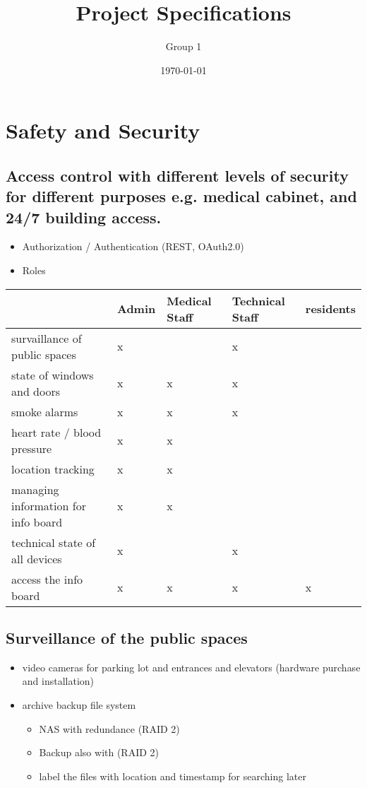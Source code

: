 \documentclass
[
 12pt, %
       DIV12,
       a4paper, %
       oneside, %
       titlepage, %
       parskip=half, %
       headings=normal, %
       listof=totoc, %
       bibliography=totoc, %
       index=totoc, %
       captions=tableheading, %
       ]{scrreprt}
\author{Group 1}
\date{\today}
\title{Project Specifications}
\begin{document}
\maketitle
\tableofcontents


\chapter{Safety and Security}
\label{sec:org8e80cf1}
\section{Access control with different levels of security for different purposes e.g. medical cabinet, and 24/7 building access.}
\label{sec:org497c288}
\begin{itemize}
\item Authorization / Authentication (REST, OAuth2.0)
\item Roles
\end{itemize}
\begin{center}
\begin{tabular}{lllll}
 & Admin & Medical Staff & Technical Staff & residents\\
\hline
survaillance of public spaces & x &  & x & \\
state of windows and doors & x & x & x & \\
smoke alarms & x & x & x & \\
heart rate / blood pressure & x & x &  & \\
location tracking & x & x &  & \\
managing information for info board & x & x &  & \\
technical state of all devices & x &  & x & \\
access the info board & x & x & x & x\\
\end{tabular}
\end{center}




\section{Surveillance of the public spaces}
\label{sec:orge645e36}
\begin{itemize}
\item video cameras for parking lot and entrances and elevators (hardware purchase and installation)
\item archive backup file system
\begin{itemize}
\item NAS with redundance (RAID 2)
\item Backup also with (RAID 2)
\item label the files with location and timestamp for searching later
\end{itemize}
\end{itemize}
\end{document}

